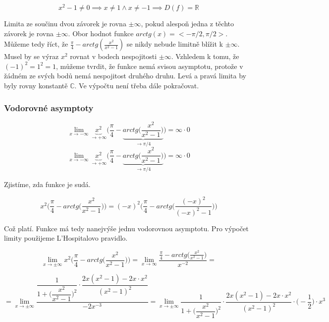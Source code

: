 \begin{displaymath}
x^2-1 \neq 0 \implies x \neq 1 \wedge x \neq -1 \implies D(f) = \mathbb{R}
\end{displaymath}

Limita ze součinu dvou závorek je rovna $ \pm \infty$, pokud alespoň jedna z těchto závorek je rovna $\pm \infty$. Obor hodnot funkce $arctg(x) = <-\pi/2,\pi/2>$. Můžeme tedy říct, že $\frac{\pi}{4}-arctg(\frac{x^2}{x^2-1})$ se nikdy nebude limitně blížit k $\pm \infty$. Musel by se výraz $x^2$ rovnat v bodech nespojitosti $\pm \infty$. Vzhledem k tomu, že $(-1)^2 = 1^2 = 1$, můžeme tvrdit, že funkce nemá svisou asymptotu, protože v žádném ze svých bodů nemá nespojitost druhého druhu. Levá a pravá limita by byly rovny konstantě $\mathbb{C}$. Ve výpočtu není třeba dále pokračovat.

\subsubsection{Vodorovné asymptoty}

\begin{displaymath}
\lim_{x \to - \infty}\underbrace{x^2}_{\rightarrow+\infty}\Big(\frac{\pi}{4}-\underbrace{arctg\Big(\frac{x^2}{x^2-1}\Big)}_{\rightarrow \pi/4}\Big) = \infty \cdot 0
\end{displaymath}
\begin{displaymath}
\lim_{x \to - \infty}\underbrace{x^2}_{\rightarrow+\infty}\Big(\frac{\pi}{4}-\underbrace{arctg\Big(\frac{x^2}{x^2-1}\Big)}_{\rightarrow \pi/4}\Big) = \infty \cdot 0
\end{displaymath}

Zjistíme, zda funkce je sudá.

\begin{displaymath}
x^2\Big(\frac{\pi}{4}-arctg\Big(\frac{x^2}{x^2-1}\Big)\Big) = 
(-x)^2\Big(\frac{\pi}{4}-arctg\Big(\frac{(-x)^2}{(-x)^2-1}\Big)\Big)
\end{displaymath}

Což platí. Funkce má tedy nanejvýše jednu vodorovnou asymptotu. Pro výpočet limity použijeme L'Hospitalovo pravidlo.

\begin{displaymath}
\lim_{x \to \pm \infty}x^2\Big(\frac{\pi}{4}-arctg\Big(\frac{x^2}{x^2-1}\Big)\Big) = \lim_{x \to \infty}\frac{\frac{\pi}{4}-arctg\Big(\frac{x^2}{x^2-1}\Big)}{x^{-2}} =
\end{displaymath}

\begin{displaymath}
= \lim_{x \to \pm \infty} \dfrac{\dfrac{1}{1+\Big(\dfrac{x^2}{x^2-1}\Big)^2}\cdot\dfrac{2x(x^2-1)-2x\cdot x^2}{(x^2-1)^2}}{-2x^{-3}} = \lim_{x \to \pm \infty}\dfrac{1}{1+\Big(\dfrac{x^2}{x^2-1}\Big)^2}\cdot\dfrac{2x(x^2-1)-2x\cdot x^2}{(x^2-1)^2} \cdot \Big(-\dfrac{1}{2}\Big) \cdot x^3
\end{displaymath}

